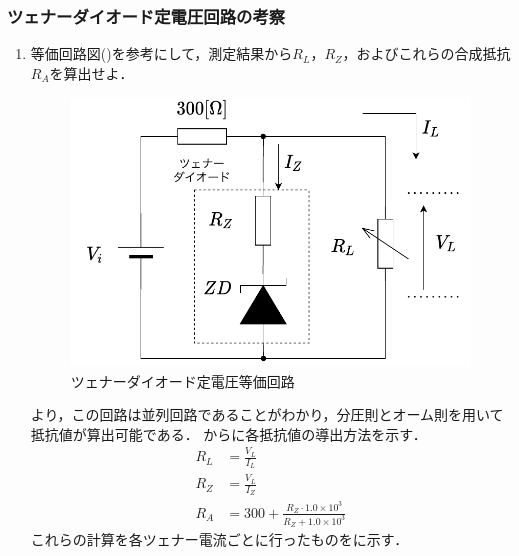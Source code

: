 \clearpage
\subsubsection{ツェナーダイオード定電圧回路の考察}
\begin{enumerate}[(1)]
	\item 等価回路図()を参考にして，測定結果から$R_{L}$，$R_{Z}$，およびこれらの合成抵抗$R_{A}$を算出せよ．
	
	\begin{figure}[h]
	\centering
	\includegraphics[scale=0.75]{./fig/zener-eq.pdf}
	\caption{ツェナーダイオード定電圧等価回路}
	\label{fig:zener-eq}
	\end{figure}
	より，この回路は並列回路であることがわかり，分圧則とオーム則を用いて抵抗値が算出可能である．
	からに各抵抗値の導出方法を示す．
\begin{align}
	R_{L}&=\frac{V_{L}}{I_{L}}\label{eq:RL}\\
	R_{Z}&=\frac{V_{L}}{I_{Z}}\label{eq:RZ}\\
	R_{A}&=300+\frac{R_{Z}\cdot 1.0\times 10^{3}}{R_{Z}+1.0\times 10^{3}}\label{eq:RA}
\end{align}
	これらの計算を各ツェナー電流ごとに行ったものをに示す．
	

\end{enumerate}
